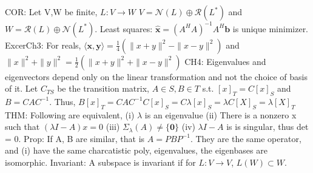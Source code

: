 \documentclass[8pt]{extarticle}
\theoremstyle{definition}
\begin{document}
{COR: Let V,W be finite, $L:V \rightarrow W$ $V = \mathscr{N}(L) \oplus \mathscr{R}(L^*)$ and $W = \mathscr{R}(L) \oplus \mathscr{N}(L^*)$.
Least squares: $\hat{ \mathbf{x}} = (A^HA)^{-1}A^H \mathbf{b}$ is unique minimizer.
ExcerCh3: For reals, $\langle \mathbf{x}, \mathbf{y} \rangle = \frac{1}{4}(\|x+y\|^2 - \|x-y\|^2)$ and $\|x\|^2 +\|y\|^2 = \frac{1}{2}(\|x+y\|^2 + \|x-y\|^2)$
CH4: Eigenvalues and eigenvectors depend only on the linear transformation and not the choice of basis of it. Let $C_{TS}$ be the transition matrix, $A \in S, B \in T$ s.t. $[x]_T = C[x]_S$ and $B = CAC^{-1}$. Thus, 
$B[x]_T = C A C^{-1} C[x]_S = C\lambda[x]_S = \lambda C[X]_S = \lambda[X]_T$
THM: Following are equivalent, (i) $\lambda$ is an eigenvalue (ii) There is a nonzero x such that $(\lambda I -A)x = 0$ (iii) $\Sigma_\lambda(A) \neq \{\mathbf{0}\}$ (iv) $\lambda I -A$ is is singular, thus det = 0.
Prop: If A, B are similar, that is $A = PBP^{-1}$. They are the same operator, and 
(i) have the same charcatistic poly, eigenvalues, the eigenbases are isomorphic.
Invariant: A subspace is invariant if for $L:V \rightarrow V$, $L(W) \subset W$. 











}
\end{document}
